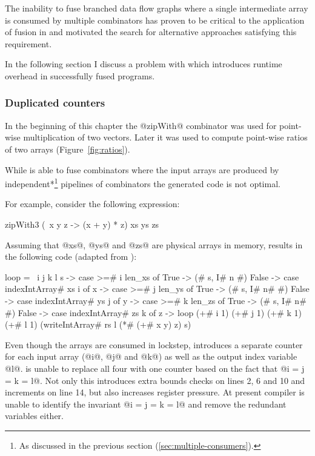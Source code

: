 \documentclass[preamble.tex]{subfiles}
\begin{document}
The inability to fuse branched data flow graphs where a single intermediate array is consumed by multiple combinators has proven to be critical to the application of fusion in \DPH and motivated the search for alternative approaches satisfying this requirement.

In the following section I discuss a problem with \StreamFusion which introduces runtime overhead in successfully fused programs.


\subsubsection{Duplicated counters}


In the beginning of this chapter the @zipWith@ combinator was used for point-wise multiplication of two vectors. Later it was used to compute point-wise ratios of two arrays (Figure~\ref{fig:ratios}).

While \StreamFusion is able to fuse  combinators where the input arrays are produced by \*independent*\footnote{As discussed in the previous section (\ref{sec:multiple-consumers}).} pipelines of combinators the generated code is not optimal.

For example, consider the following expression:

\begin{hscode}
zipWith3 (\ x y z -> (x + y) * z) xs ys zs
\end{hscode}

Assuming that @xs@, @ys@ and @zs@ are physical arrays in memory, \StreamFusion results in the following  code (adapted from \cite{FlowFusion}):

\begin{hscode}[numbers=left]
loop = \ i j k l s ->
  case >=# i len_xs of
    True  -> (# s, I# n #)
    False ->
      case indexIntArray# xs i of x ->
        case >=# j len_ys of
          True  -> (# s, I# n# #)
          False ->
            case indexIntArray# ys j of y ->
              case >=# k len_zs of
                True  -> (# s, I# n# #)
                False ->
                  case indexIntArray# zs k of z ->
                    loop (+# i 1) (+# j 1) (+# k 1) (+# l 1)
                      (writeIntArray# rs l (*# (+# x y) z) s)
\end{hscode}

Even though the arrays are consumed in lockstep, \StreamFusion introduces a separate counter for each input array (@i@, @j@ and @k@) as well as the output index variable @l@. \StreamFusion is unable to replace all four with one counter based on the fact that @i = j = k = l@. Not only this introduces extra bounds checks on lines 2, 6 and 10 and increments on line 14, but also increases register pressure. At present \GHC compiler is unable to identify the invariant @i = j = k = l@ and remove the redundant variables either.
\end{document}
